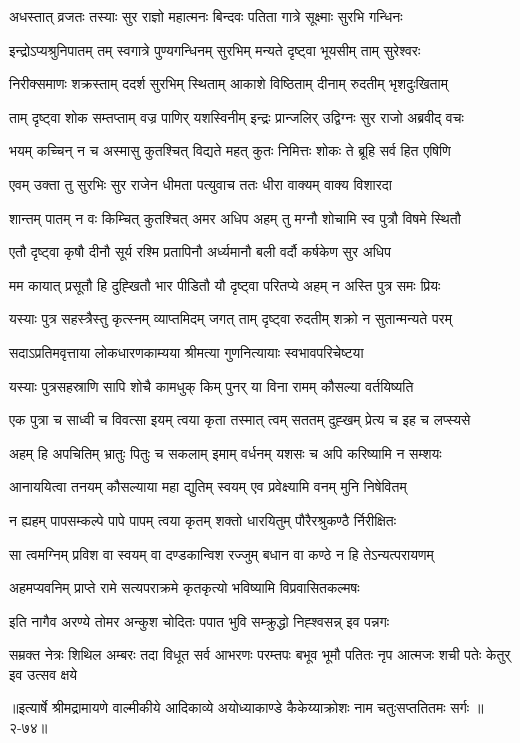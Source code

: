 \twolineshloka
{अधस्तात् व्रजतः तस्याः सुर राज्ञो महात्मनः}
{बिन्दवः पतिता गात्रे सूक्ष्माः सुरभि गन्धिनः} %

\twolineshloka
{इन्द्रोऽप्यश्रुनिपातम् तम् स्वगात्रे पुण्यगन्धिनम्}
{सुरभिम् मन्यते दृष्ट्वा भूयसीम् ताम् सुरेश्वरः} %

\twolineshloka
{निरीक्समाणः शक्रस्ताम् ददर्श सुरभिम् स्थिताम्}
{आकाशे विष्ठिताम् दीनाम् रुदतीम् भृशदुःखिताम्} %

\twolineshloka
{ताम् दृष्ट्वा शोक सम्तप्ताम् वज्र पाणिर् यशस्विनीम्}
{इन्द्रः प्रान्जलिर् उद्विग्नः सुर राजो अब्रवीद् वचः} %

\twolineshloka
{भयम् कच्चिन् न च अस्मासु कुतश्चित् विद्यते महत्}
{कुतः निमित्तः शोकः ते ब्रूहि सर्व हित एषिणि} %

\twolineshloka
{एवम् उक्ता तु सुरभिः सुर राजेन धीमता}
{पत्युवाच ततः धीरा वाक्यम् वाक्य विशारदा} %

\twolineshloka
{शान्तम् पातम् न वः किम्चित् कुतश्चित् अमर अधिप}
{अहम् तु मग्नौ शोचामि स्व पुत्रौ विषमे स्थितौ} %

\twolineshloka
{एतौ दृष्ट्वा कृषौ दीनौ सूर्य रश्मि प्रतापिनौ}
{अर्ध्यमानौ बली वर्दौ कर्षकेण सुर अधिप} %

\twolineshloka
{मम कायात् प्रसूतौ हि दुह्खितौ भार पीडितौ}
{यौ दृष्ट्वा परितप्ये अहम् न अस्ति पुत्र समः प्रियः} %

\twolineshloka
{यस्याः पुत्र सहस्त्रैस्तु कृत्स्नम् व्याप्तमिदम् जगत्}
{ताम् दृष्ट्वा रुदतीम् शक्रो न सुतान्मन्यते परम्} %

\twolineshloka
{सदाऽप्रतिमवृत्ताया लोकधारणकाम्यया}
{श्रीमत्या गुणनित्यायाः स्वभावपरिचेष्टया} %

\twolineshloka
{यस्याः पुत्रसहस्राणि सापि शोचै कामधुक्}
{किम् पुनर् या विना रामम् कौसल्या वर्तयिष्यति} %

\twolineshloka
{एक पुत्रा च साध्वी च विवत्सा इयम् त्वया कृता}
{तस्मात् त्वम् सततम् दुह्खम् प्रेत्य च इह च लप्स्यसे} %

\twolineshloka
{अहम् हि अपचितिम् भ्रातुः पितुः च सकलाम् इमाम्}
{वर्धनम् यशसः च अपि करिष्यामि न सम्शयः} %

\twolineshloka
{आनाययित्वा तनयम् कौसल्याया महा द्युतिम्}
{स्वयम् एव प्रवेक्ष्यामि वनम् मुनि निषेवितम्} %

\twolineshloka
{न ह्यहम् पापसम्कल्पे पापे पापम् त्वया कृतम्}
{शक्तो धारयितुम् पौरैरश्रुकण्ठै र्निरीक्षितः} %

\twolineshloka
{सा त्वमग्निम् प्रविश वा स्वयम् वा दण्डकान्विश}
{रज्जुम् बधान वा कण्ठे न हि तेऽन्यत्परायणम्} %

\twolineshloka
{अहमप्यवनिम् प्राप्ते रामे सत्यपराक्रमे}
{कृतकृत्यो भविष्यामि विप्रवासितकल्मषः} %

\twolineshloka
{इति नागैव अरण्ये तोमर अन्कुश चोदितः}
{पपात भुवि सम्क्रुद्धो निह्श्वसन्न् इव पन्नगः} %

\fourlineindentedshloka
{सम्रक्त नेत्रः शिथिल अम्बरः तदा}
{विधूत सर्व आभरणः परम्तपः}
{बभूव भूमौ पतितः नृप आत्मजः}
{शची पतेः केतुर् इव उत्सव क्षये} %


॥इत्यार्षे श्रीमद्रामायणे वाल्मीकीये आदिकाव्ये अयोध्याकाण्डे कैकेय्याक्रोशः नाम चतुःसप्ततितमः सर्गः ॥२-७४॥
